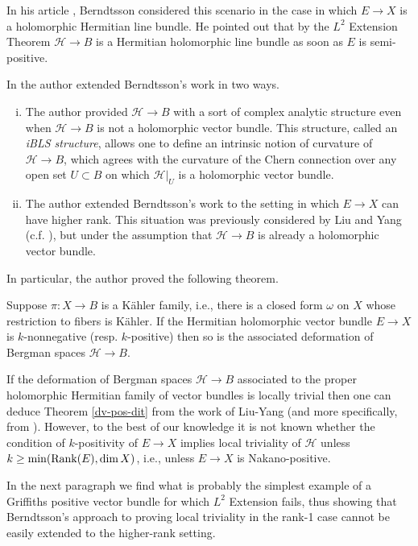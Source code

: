 \documentclass[12pt,hidelinks]{amsart}
\newcommand{\sH}{{\mathscr H}}
\begin{document}
In his article \cite{bo-annals}, Berndtsson considered this scenario in the case in which $E \to X$ is a holomorphic Hermitian line bundle.  He pointed out that by the $L^2$ Extension Theorem $\sH \to B$ is a Hermitian holomorphic line bundle as soon as $E$ is semi-positive.  

In \cite{v-BLS} the author extended Berndtsson's work in two ways.  
\begin{enumerate}[i.]
\item The author provided $\sH \to B$ with a sort of complex analytic structure even when $\sH \to B$ is not a holomorphic vector bundle.  This structure, called an \emph{iBLS structure}, allows one to define an intrinsic notion of curvature of $\sH \to B$, which agrees with the curvature of the Chern connection over any open set $U \subset B$ on which $\sH|_U$ is a holomorphic vector bundle.
\item The author extended Berndtsson's work to the setting in which $E \to X$ can have higher rank.  This situation was previously considered by Liu and Yang (c.f. \cite{ly}), but under the assumption that $\sH \to B$ is already a holomorphic vector bundle.
\end{enumerate}
In particular, the author proved the following theorem.

\begin{thm}\label{dv-pos-dit}
Suppose $\pi :X \to B$ is a K\"ahler family, i.e., there is a closed form $\omega$    on $X$ whose restriction to fibers is K\"ahler.  If the Hermitian holomorphic vector bundle $E \to X$ is $k$-nonnegative (resp. $k$-positive) then so is the associated deformation of Bergman spaces $\sH \to B$.
\end{thm}

If the deformation of Bergman spaces $\sH \to B$ associated to the proper holomorphic Hermitian family of vector bundles is locally trivial then one can deduce Theorem \ref{dv-pos-dit} from the work of Liu-Yang (and more specifically, from \cite[Theorem 1.6]{ly}).  However, to the best of our knowledge it is not known whether the condition of $k$-positivity of $E \to X$ implies local triviality of $\sH$ unless $k \ge \min ({\rm Rank}(E), \dim X)$, i.e., unless $E \to X$ is Nakano-positive.

In the next paragraph we find what is probably the simplest example of a Griffiths positive vector bundle for which $L^2$ Extension fails, thus showing that Berndtsson's approach to proving local triviality in the rank-1 case cannot be easily extended to the higher-rank setting.  
\end{document}
